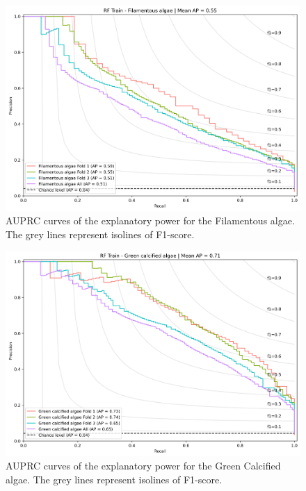 \begin{figure}
\hypertarget{fig:chap3figS27}{%
\centering
\includegraphics{03-Chapitre3/figures/supplementary/03-precision_recall_curve_train_rf_Filamentous algae.png}
\caption{AUPRC curves of the explanatory power for the Filamentous
algae. The grey lines represent isolines of
F1-score.}\label{fig:chap3figS27}
}
\end{figure}

\begin{figure}
\hypertarget{fig:chap3figS28}{%
\centering
\includegraphics{03-Chapitre3/figures/supplementary/03-precision_recall_curve_train_rf_Green calcified algae.png}
\caption{AUPRC curves of the explanatory power for the Green Calcified
algae. The grey lines represent isolines of
F1-score.}\label{fig:chap3figS28}
}
\end{figure}

